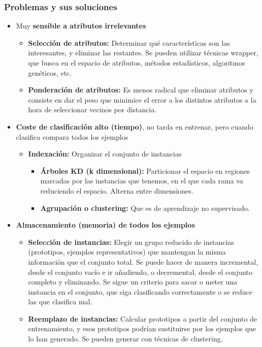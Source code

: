 \documentclass[12pt, twoside, openright]{report} %
\begin{document}
\subsubsection{Problemas y sus soluciones}
\begin{itemize}
	\item Muy \textbf{sensible a atributos irrelevantes}
	      \begin{itemize}
		      \item \textbf{Selección de atributos:} Determinar qué características son las interesantes, y eliminar las restantes. Se pueden utilizar técnicas wrapper, que busca en el espacio de atributos, métodos estadísticos, algoritmos genéticos, etc.
		      \item \textbf{Ponderación de atributos:} Es menos radical que eliminar atributos y consiste en dar el peso que minimice el error a los distintos atributos a la hora de seleccionar vecinos por distancia.
	      \end{itemize}
	\item \textbf{Coste de clasificación alto (tiempo)}, no tarda en entrenar, pero cuando clasifica compara todos los ejemplos
	      \begin{itemize}
		      \item \textbf{Indexación:} Organizar el conjunto de instancias
		            \begin{itemize}
			            \item \textbf{Árboles KD (k dimensional):} Particionar el espacio en regiones marcadas por las instancias que tenemos, en el que cada rama va reduciendo el espacio. Alterna entre dimensiones.

			                  \begin{figure}[H]
				                  {\def\svgwidth{.6\textwidth}
								   }
			                  \end{figure}
			            \item \textbf{Agrupación o clustering:} Que es de aprendizaje no supervisado.
		            \end{itemize}
	      \end{itemize}
	\item \textbf{Almacenamiento (memoria) de todos los ejemplos}
	      \begin{itemize}
		      \item \textbf{Selección de instancias:} Elegir un grupo reducido de instancias (prototipos, ejemplos representativos) que mantengan la misma información que el conjunto total. Se puede hacer de manera incremental, desde el conjunto vacío e ir añadiendo, o decremental, desde el conjunto completo y eliminando. Se sigue un criterio para sacar o meter una instancia en el conjunto, que siga clasificando correctamente o se reduce las que clasifica mal.
		      \item \textbf{Reemplazo de instancias:} Calcular prototipos a partir del conjunto de entrenamiento, y esos prototipos podrían sustituirse por los ejemplos que lo han generado. Se pueden generar con técnicas de clustering.
	      \end{itemize}


\end{itemize}
\end{document}
